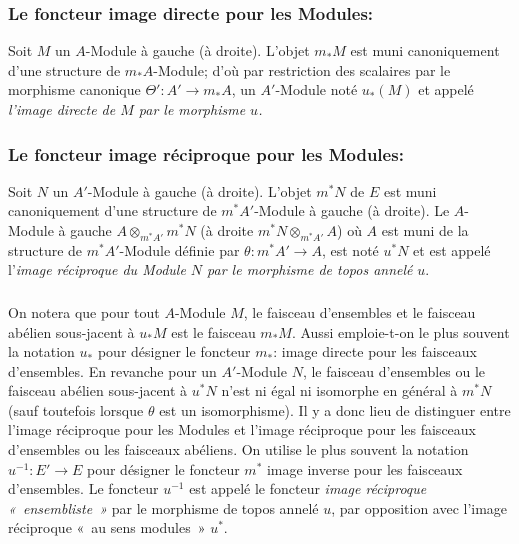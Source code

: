 \documentclass[10pt]{../fichiers-configuration-latex/smfart}
\begin{document}
\subsubsection{Le foncteur image directe pour les
  Modules:}
Soit $M$ un $A$-Module à gauche (\resp à droite). L'objet
$m_{\ast}M$ est muni canoniquement d'une structure de
$m_{\ast}A$-Module; d'où par restriction des scalaires par le
morphisme canonique $\Theta':A'\rightarrow m_{\ast}A$, un
$A'$-Module noté $u_{\ast}(M)$ et appelé \emph{l'image directe de
$M$ par le morphisme $u$.}

\subsubsection{Le foncteur image réciproque pour les
  Modules:}
Soit $N$ un $A'$-Module à gauche (\resp à droite). L'objet
$m^{\ast}N$ de $E$ est muni canoniquement d'une structure de
$m^{\ast}A'$-Module à gauche (\resp à droite). Le $A$-Module à
gauche $A\otimes_{m^{\ast}A'}m^{\ast}N$ (\resp à droite
$m^{\ast}N\otimes_{m^{\ast}A'}A$) où $A$ est muni de la structure de
$m^{\ast}A'$-Module définie par $\theta:m^{\ast}A'\rightarrow A$,
est noté $u^{\ast}N$ et est appelé l'\emph{image réciproque du
Module $N$ par le morphisme de topos annelé} $u$.

\subsubsection{}
On notera que pour tout $A$-Module $M$, le faisceau d'ensembles et
le faisceau abélien sous-jacent à $u_{\ast}M$ est le faisceau
$m_{\ast}M$. Aussi emploie-t-on le plus souvent la notation
$u_{\ast}$ pour désigner le foncteur $m_{\ast}$: image directe pour
les faisceaux d'ensembles. En revanche pour un $A'$-Module $N$, le
faisceau d'ensembles ou le faisceau abélien sous-jacent à
$u^{\ast}N$ n'est ni égal ni isomorphe en général à $m^{\ast}N$
(sauf toutefois lorsque $\theta$ est un isomorphisme). Il y a donc
lieu de distinguer entre l'image réciproque pour les Modules et
l'image réciproque pour les faisceaux d'ensembles ou les faisceaux
abéliens. On utilise le plus souvent la notation
$u^{-1}:E'\rightarrow E$ pour désigner le foncteur $m^{\ast}$ image
inverse pour les faisceaux d'ensembles. Le foncteur $u^{-1}$ est
appelé le foncteur \emph{image réciproque « ensembliste »} par
le morphisme de topos annelé $u$, par opposition avec l'image
réciproque « au sens modules »  $u^{\ast}$.
\end{document}
